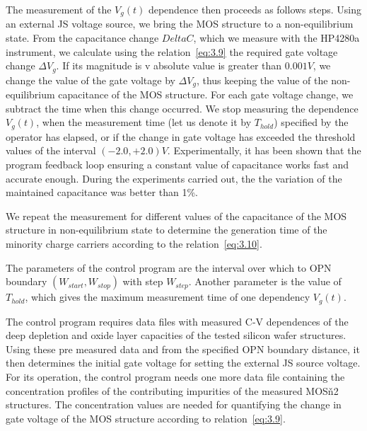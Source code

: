 The measurement of the $V_{g}(t)$ dependence then proceeds as follows
steps. Using an external JS voltage source, we bring the MOS structure
to a non-equilibrium state. From the capacitance change ${Delta{C}}$,
which we measure with the HP4280a instrument, we calculate using the
relation~\ref{eq:3.9} the required gate voltage change
$\Delta{V_{g}}$. If its magnitude is v absolute value is greater than
$0.001 V$, we change the value of the gate voltage by $\Delta{V_{g}}$,
thus keeping the value of the non-equilibrium capacitance of the MOS
structure. For each gate voltage change, we subtract the time when
this change occurred. We stop measuring the dependence $V_{g}(t)$,
when the measurement time (let us denote it by $T_{hold}$) specified
by the operator has elapsed, or if the change in gate voltage has
exceeded the threshold values of the interval $(-2.0,+2.0) V$.
Experimentally, it has been shown that the program feedback loop
ensuring a constant value of capacitance works fast and accurate
enough. During the experiments carried out, the the variation of the
maintained capacitance was better than 1\%.

We repeat the measurement for different values of the capacitance of
the MOS structure in non-equilibrium state to determine the generation
time of the minority charge carriers according to the
relation~\ref{eq:3.10}.

The parameters of the control program are the interval over which to
OPN boundary $(W_{start}, W_{stop})$ with step $W_{step}$. Another
parameter is the value of $T_{hold}$, which gives the maximum
measurement time of one dependency $V_{g}(t)$.

The control program requires data files with measured C-V dependences
of the deep depletion and oxide layer capacities of the tested silicon
wafer structures. Using these pre measured data and from the specified
OPN boundary distance, it then determines the initial gate voltage for
setting the external JS source voltage.  For its operation, the
control program needs one more data file containing the concentration
profiles of the contributing impurities of the measured MOSň2
structures. The concentration values are needed for quantifying the
change in gate voltage of the MOS structure according to
relation~\ref{eq:3.9}.

